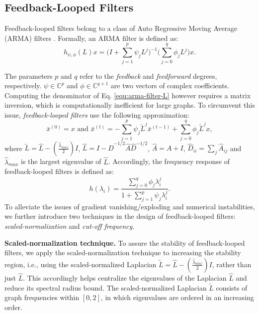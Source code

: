 \documentclass{article}
\begin{document}
\subsection{Feedback-Looped Filters}\label{subsec:filters}
Feedback-looped filters belong to a class of Auto Regressive Moving Average (ARMA) filters \cite{isufi2017autoregressive2,isufi2017autoregressive1}.
Formally, an ARMA filter is defined as:
\begin{equation}\label{equ:arma-filter-L}
h_{\psi,\phi}(L)x=\Big(I+\sum_{j=1}^{p} \psi_j L^j \Big)^{-1} \Big(\sum_{j=0}^q \phi_j L^j\Big)x.
\end{equation}
\begin{comment}
\begin{equation}\label{equ:arma-filter-lambda}
h_{\psi, \phi}(\lambda)=\frac{h_{\phi}(\lambda)}{h_{\psi}(\lambda)}=\frac{\sum_{j=0}^{q} \phi_j  \lambda^j}{1+\sum_{j=1}^{p} \psi_j \lambda^j}.
\end{equation}
\end{comment}
The parameters $p$  and $q$ refer to the \emph{feedback} and \emph{feedforward} degrees, respectively. $\psi\in \mathbb{C}^p$ and $\phi\in \mathbb{C}^{q+1}$ are two vectors of complex coefficients. 
Computing the denominator of Eq. \ref{equ:arma-filter-L} however requires a matrix inversion, which is computationally inefficient for large graphs. To circumvent this issue, \emph{feedback-looped filters} use the following approximation: \begin{equation}\label{equ:feedback-looped}
\bar{x}^{(0)}=x \text{  and  }\bar{x}^{(t)}=-\sum_{j=1}^{p}\psi_j\tilde{L}^j \bar{x}^{(t-1)} + \sum_{j=0}^{q} \phi_j \tilde{L}^j x, 
\end{equation}
where $\tilde{L}=\hat{L} - (\frac{\hat{\lambda}_{max}}{2})I$, $\hat{L}=I - \hat{D}^{-1/2} \hat{A} \hat{D}^{-1/2}$, $\hat{A}=A+I$, $\hat{D}_{ii}=\sum_{j} \hat{A}_{ij}$ and $\hat{\lambda}_{max}$ is the largest eigenvalue of $\hat{L}$. Accordingly, the frequency response of feedback-looped filters is defined as:
\begin{equation}\label{equ:arma-filter-lambda2}
h(\lambda_i)=\frac{\sum_{j=0}^{q} \phi_j  \lambda_i^j}{1+\sum_{j=1}^{p} \psi_j \lambda_i^j}.
\end{equation}
To alleviate the issues of gradient vanishing/exploding and numerical instabilities, we further introduce two techniques in the design of feedback-looped filters: \emph{scaled-normalization} and \emph{cut-off frequency}. 

\noindent\textbf{Scaled-normalization technique. } To assure the stability of feedback-looped filters, we apply the scaled-normalization technique to increasing the stability region, i.e., using the scaled-normalized Laplacian $\tilde{L}=\hat{L} - (\frac{\hat{\lambda}_{max}}{2})I$, rather than just $\hat{L}$. This accordingly helps centralize the eigenvalues of the Laplacian $\hat{L}$ and reduce its spectral radius bound. The scaled-normalized Laplacian $\tilde{L}$ consists of graph frequencies within $[0, 2]$, in which eigenvalues are ordered in an increasing order. 
\end{document}
